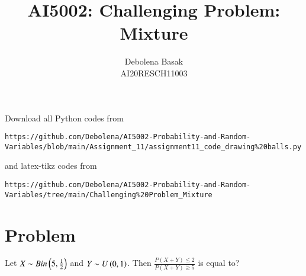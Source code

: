 \documentclass[journal,12pt,twocolumn]{IEEEtran}
\begin{document}
     \def\rightbox#1{\makebox[0in][r]{#1}}
     \def\centbox#1{\makebox[0in]{#1}}
     \def\topbox#1{\raisebox{-\baselineskip}[0in][0in]{#1}}
     \def\midbox#1{\raisebox{-0.5\baselineskip}[0in][0in]{#1}}
\vspace{3cm}
\title{AI5002: Challenging Problem: Mixture}
\author{Debolena Basak\\ AI20RESCH11003}
\maketitle
\newpage
\bigskip
\renewcommand{\thefigure}{\theenumi}
\renewcommand{\thetable}{\theenumi}
Download all Python codes from 
\begin{lstlisting}
https://github.com/Debolena/AI5002-Probability-and-Random-Variables/blob/main/Assignment_11/assignment11_code_drawing%20balls.py
\end{lstlisting}
%
and latex-tikz codes from 
%
\begin{lstlisting}
https://github.com/Debolena/AI5002-Probability-and-Random-Variables/tree/main/Challenging%20Problem_Mixture
\end{lstlisting}
\section{Problem}
Let $X \sim Bin \left(5, \frac{1}{2}\right)$ and $Y \sim U\left(0,1\right)$. Then $\frac{P(X+Y) \le 2}{P(X+Y) \ge 5}$ is equal to?
\end{document}

